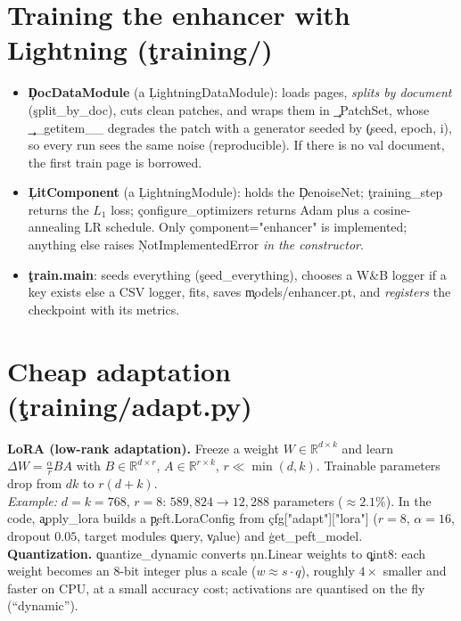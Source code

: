 \section{Training the enhancer with Lightning (\c{training/})}
\begin{itemize}
 \item \textbf{\c{DocDataModule}} (a \c{LightningDataModule}): loads pages, \emph{splits by document} (\c{split\_by\_doc}), cuts clean patches, and wraps them in \c{\_PatchSet}, whose \c{\_\_getitem\_\_} degrades the patch with a generator seeded by \c{(seed, epoch, i)}, so every run sees the same noise (reproducible). If there is no val document, the first train page is borrowed.
 \item \textbf{\c{LitComponent}} (a \c{LightningModule}): holds the \c{DenoiseNet}; \c{training\_step} returns the $L_1$ loss; \c{configure\_optimizers} returns Adam plus a cosine-annealing LR schedule. Only \c{component="enhancer"} is implemented; anything else raises \c{NotImplementedError} \emph{in the constructor}.
 \item \textbf{\c{train.main}}: seeds everything (\c{seed\_everything}), chooses a W\&B logger if a key exists else a CSV logger, fits, saves \c{models/enhancer.pt}, and \emph{registers} the checkpoint with its metrics.
\end{itemize}
\section{Cheap adaptation (\c{training/adapt.py})}
\textbf{LoRA (low-rank adaptation).} Freeze a weight $W\in\mathbb{R}^{d\times k}$ and learn $\Delta W=\frac{\alpha}{r}BA$ with $B\in\mathbb{R}^{d\times r}$, $A\in\mathbb{R}^{r\times k}$, $r\ll\min(d,k)$. Trainable parameters drop from $dk$ to $r(d+k)$.\\
\emph{Example:} $d=k=768$, $r=8$: $589{,}824\to12{,}288$ parameters ($\approx2.1\%$). In the code, \c{apply\_lora} builds a \c{peft.LoraConfig} from \c{cfg["adapt"]["lora"]} ($r=8$, $\alpha=16$, dropout $0.05$, target modules \c{query}, \c{value}) and \c{get\_peft\_model}.\\
\textbf{Quantization.} \c{quantize\_dynamic} converts \c{nn.Linear} weights to \c{qint8}: each weight becomes an 8-bit integer plus a scale ($w\approx s\cdot q$), roughly $4\times$ smaller and faster on CPU, at a small accuracy cost; activations are quantised on the fly (``dynamic'').

